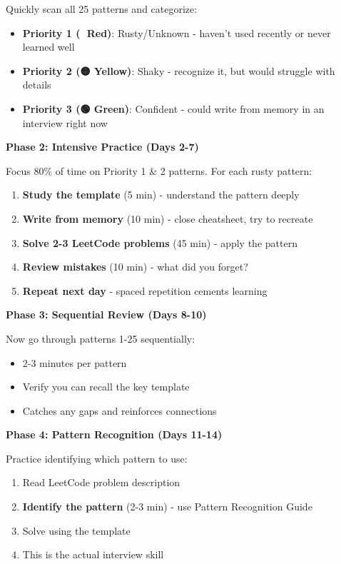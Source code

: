 \documentclass[10pt]{article}
\begin{document}
Quickly scan all 25 patterns and categorize:
\begin{itemize}
\item \colorbox{priority1}{\textbf{Priority 1 (🔴 Red)}}: Rusty/Unknown - haven't used recently or never learned well
\item \colorbox{priority2}{\textbf{Priority 2 (🟡 Yellow)}}: Shaky - recognize it, but would struggle with details
\item \colorbox{priority3}{\textbf{Priority 3 (🟢 Green)}}: Confident - could write from memory in an interview right now
\end{itemize}

\textbf{Phase 2: Intensive Practice (Days 2-7)}

Focus 80\% of time on Priority 1 \& 2 patterns. For each rusty pattern:
\begin{enumerate}
\item \textbf{Study the template} (5 min) - understand the pattern deeply
\item \textbf{Write from memory} (10 min) - close cheatsheet, try to recreate
\item \textbf{Solve 2-3 LeetCode problems} (45 min) - apply the pattern
\item \textbf{Review mistakes} (10 min) - what did you forget?
\item \textbf{Repeat next day} - spaced repetition cements learning
\end{enumerate}

\textbf{Phase 3: Sequential Review (Days 8-10)}

Now go through patterns 1-25 sequentially:
\begin{itemize}
\item 2-3 minutes per pattern
\item Verify you can recall the key template
\item Catches any gaps and reinforces connections
\end{itemize}

\textbf{Phase 4: Pattern Recognition (Days 11-14)}

Practice identifying which pattern to use:
\begin{enumerate}
\item Read LeetCode problem description
\item \textbf{Identify the pattern} (2-3 min) - use Pattern Recognition Guide
\item Solve using the template
\item This is the actual interview skill
\end{enumerate}
\end{document}
